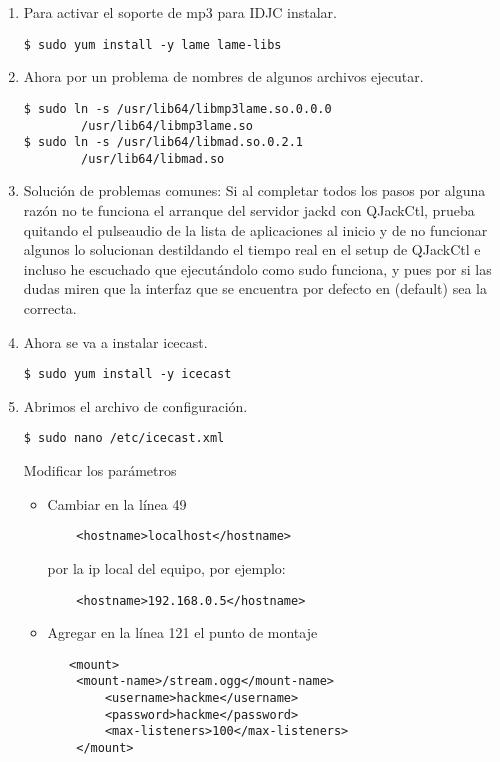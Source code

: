 \begin{multicols}{2}
\begin{enumerate}
\item Para activar el soporte de mp3 para IDJC instalar. 

\begin{lstlisting}
$ sudo yum install -y lame lame-libs
\end{lstlisting}

\item Ahora por un problema de nombres de algunos archivos ejecutar. 

\begin{lstlisting}
$ sudo ln -s /usr/lib64/libmp3lame.so.0.0.0 
		/usr/lib64/libmp3lame.so
$ sudo ln -s /usr/lib64/libmad.so.0.2.1 
		/usr/lib64/libmad.so
\end{lstlisting}

\item Solución de problemas comunes: Si al completar todos los pasos por alguna razón no te funciona el arranque del servidor jackd con QJackCtl, prueba quitando el pulseaudio de la lista de aplicaciones al inicio y de no funcionar algunos lo solucionan destildando el tiempo real en el setup de QJackCtl e incluso he escuchado que ejecutándolo como sudo funciona, y pues por si las dudas miren que la interfaz que se encuentra por defecto en (default) sea la correcta.

\item Ahora se va a instalar icecast.

\begin{lstlisting}
$ sudo yum install -y icecast
\end{lstlisting}

\item Abrimos el archivo de configuración.

\begin{lstlisting}
$ sudo nano /etc/icecast.xml
\end{lstlisting}

Modificar los parámetros

\begin{itemize}
\item Cambiar en la línea 49
\begin{lstlisting}
    <hostname>localhost</hostname>
\end{lstlisting}
por la ip local del equipo, por ejemplo:
\begin{lstlisting}
    <hostname>192.168.0.5</hostname>
\end{lstlisting}
\item Agregar en la línea 121 el punto de montaje
\begin{lstlisting}
   <mount>
	<mount-name>/stream.ogg</mount-name>
        <username>hackme</username>
        <password>hackme</password>
        <max-listeners>100</max-listeners>
    </mount>
\end{lstlisting}
\end{itemize}


\end{enumerate}
\end{multicols}
